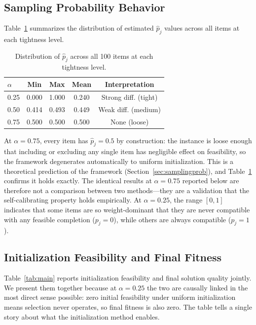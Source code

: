 \documentclass[twocolumn]{article}
\begin{document}
\subsection{Sampling Probability Behavior}

Table~\ref{tab:pj} summarizes the distribution of estimated $\hat{p}_j$ 
values across all items at each tightness level. 

\begin{table}[H]
\centering
\begin{tabular}{lcccc}
\toprule
$\alpha$ & Min & Max & Mean & Interpretation \\
\midrule
0.25 & 0.000 & 1.000 & 0.240 & Strong diff. (tight) \\
0.50 & 0.414 & 0.493 & 0.449 & Weak diff. (medium) \\
0.75 & 0.500 & 0.500 & 0.500 & None (loose) \\
\bottomrule
\end{tabular}
\caption{Distribution of $\hat{p}_j$ across all 100 items at each 
tightness level.}
\label{tab:pj}
\end{table}

At $\alpha = 0.75$, every item has $\hat{p}_j = 0.5$ by construction: 
the instance is loose enough that including or excluding any single item 
has negligible effect on feasibility, so the framework degenerates 
automatically to uniform initialization. This is a theoretical prediction 
of the framework (Section~\ref{sec:samplingprob}), and Table~\ref{tab:pj} 
confirms it holds exactly. The identical results at $\alpha = 0.75$ 
reported below are therefore not a comparison between two methods---they 
are a validation that the self-calibrating property holds empirically. 
At $\alpha = 0.25$, the range $[0, 1]$ indicates that some items are 
so weight-dominant that they are never compatible with any feasible 
completion ($p_j = 0$), while others are always compatible ($p_j = 1$).

\subsection{Initialization Feasibility and Final Fitness}

Table~\ref{tab:main} reports initialization feasibility and final 
solution quality jointly. We present them together because at 
$\alpha = 0.25$ the two are causally linked in the most direct sense 
possible: zero initial feasibility under uniform initialization means 
selection never operates, so final fitness is also zero. The table 
tells a single story about what the initialization method enables.
\end{document}
